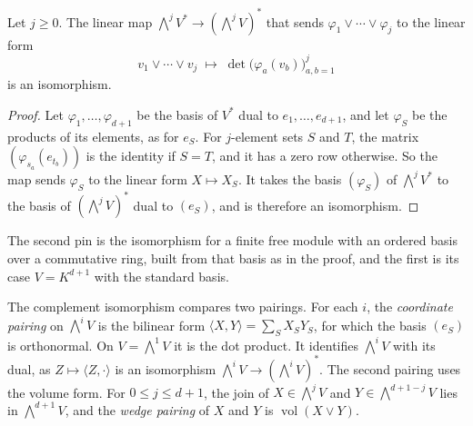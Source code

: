 \begin{definition}
  \label{def:meet-pairing-dual}
  \leanok
  Let $j \ge 0$. The linear map
  $\bigwedge^{j} V^{*} \to (\bigwedge^{j} V)^{*}$ that sends
  $\varphi_1 \vee \cdots \vee \varphi_j$ to the linear form
  \[
    v_1 \vee \cdots \vee v_j \;\longmapsto\;
    \det\bigl(\varphi_a(v_b)\bigr)_{a,b = 1}^{j}
  \]
  is an isomorphism.
\end{definition}
\begin{proof}
  \leanok
  Let $\varphi_1, \dots, \varphi_{d+1}$ be the basis of $V^*$ dual to
  $e_1, \dots, e_{d+1}$, and let $\varphi_S$ be the products of its
  elements, as for $e_S$. For $j$-element sets $S$ and $T$, the matrix
  $(\varphi_{s_a}(e_{t_b}))$ is the identity if $S = T$, and it has a
  zero row otherwise. So the map sends $\varphi_S$ to the linear form
  $X \mapsto X_S$. It takes the basis $(\varphi_S)$ of
  $\bigwedge^j V^*$ to the basis of $(\bigwedge^j V)^*$ dual to
  $(e_S)$, and is therefore an isomorphism.
\end{proof}
\begin{fmlnote}
  The second pin is the isomorphism for a finite free module with an
  ordered basis over a commutative ring, built from that basis as in the
  proof, and the first is its case $V = K^{d+1}$ with the standard
  basis.
\end{fmlnote}

The complement isomorphism compares two pairings. For each $i$, the
\emph{coordinate pairing} on $\bigwedge^i V$ is the bilinear form
$\langle X, Y \rangle = \sum_S X_S Y_S$, for which the basis $(e_S)$ is
orthonormal. On $V = \bigwedge^1 V$ it is the dot product. It identifies
$\bigwedge^i V$ with its dual, as $Z \mapsto \langle Z, \cdot \rangle$
is an isomorphism $\bigwedge^i V \to (\bigwedge^i V)^*$. The second
pairing uses the volume form. For $0 \le j \le d+1$, the join of
$X \in \bigwedge^j V$ and $Y \in \bigwedge^{d+1-j} V$ lies in
$\bigwedge^{d+1} V$, and the \emph{wedge pairing} of $X$ and $Y$ is
$\operatorname{vol}(X \vee Y)$.

